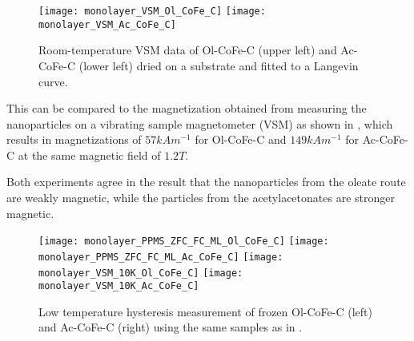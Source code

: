 \documentclass[\main/dresen_thesis.tex]{subfiles}
\begin{document}
  \label{sec:monolayers:nanoparticle:vsm}

    \begin{figure}[tb]
      \centering
      \texttt{[image: monolayer\_VSM\_Ol\_CoFe\_C]}
      \texttt{[image: monolayer\_VSM\_Ac\_CoFe\_C]}
      \caption{\label{fig:monolayers:nanoparticle:vsm}Room-temperature VSM data of Ol-CoFe-C (upper left) and Ac-CoFe-C (lower left) dried on a substrate and fitted to a Langevin curve.}
    \end{figure}

    This can be compared to the magnetization obtained from measuring the nanoparticles on a vibrating sample magnetometer (VSM) as shown in , which results in magnetizations of $57 \unit{kAm^{-1}}$ for Ol-CoFe-C and $149 \unit{kAm^{-1}}$ for Ac-CoFe-C at the same magnetic field of $1.2 \unit{T}$.

    Both experiments agree in the result that the nanoparticles from the oleate route are weakly magnetic, while the particles from the acetylacetonates are stronger magnetic.

  \begin{figure}[tb]
    \centering
    \texttt{[image: monolayer\_PPMS\_ZFC\_FC\_ML\_Ol\_CoFe\_C]}
    \texttt{[image: monolayer\_PPMS\_ZFC\_FC\_ML\_Ac\_CoFe\_C]}
    \texttt{[image: monolayer\_VSM\_10K\_Ol\_CoFe\_C]}
    \texttt{[image: monolayer\_VSM\_10K\_Ac\_CoFe\_C]}
    \caption{\label{fig:monolayers:nanoparticle:vsm10K}Low temperature hysteresis measurement of frozen Ol-CoFe-C (left) and Ac-CoFe-C (right) using the same samples as in .}
  \end{figure}
\end{document}
